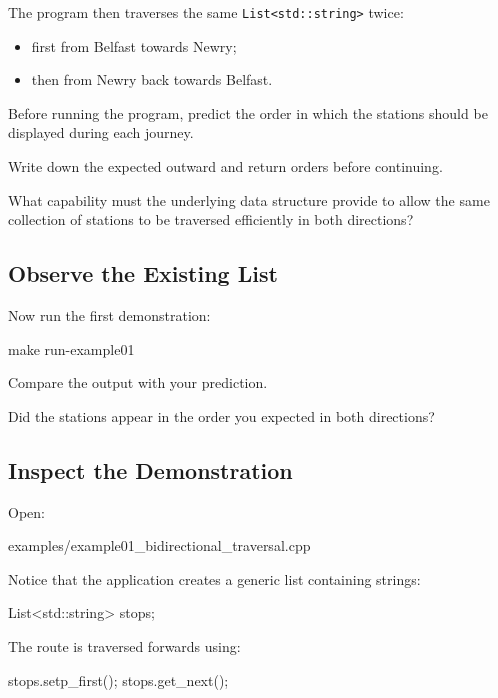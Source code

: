 \documentclass{csc2059practical}
\begin{document}
The program then traverses the same \texttt{List<std::string>} twice:

\begin{itemize}
    \item first from Belfast towards Newry;
    \item then from Newry back towards Belfast.
\end{itemize}

Before running the program, predict the order in which the stations should be displayed during each journey.

\begin{reflectionbox}
Write down the expected outward and return orders before continuing.

What capability must the underlying data structure provide to allow the same collection of stations to be traversed efficiently in both directions?
\end{reflectionbox}


\subsection{Observe the Existing List}

Now run the first demonstration:

\begin{terminal}
make run-example01
\end{terminal}

Compare the output with your prediction.

Did the stations appear in the order you expected in both directions?


\subsection{Inspect the Demonstration}

Open:

\begin{terminal}
examples/example01_bidirectional_traversal.cpp
\end{terminal}

Notice that the application creates a generic list containing strings:

\begin{cppcode}
List<std::string> stops;
\end{cppcode}

The route is traversed forwards using:

\begin{cppcode}
stops.setp_first();
stops.get_next();
\end{cppcode}
\end{document}
